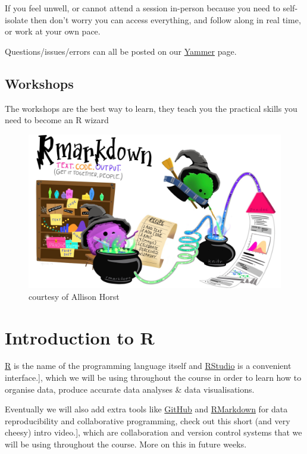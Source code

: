 \documentclass[
]{book}
\begin{document}
If you feel unwell, or cannot attend a session in-person because you need to self-isolate then don't worry you can access everything, and follow along in real time, or work at your own pace.

Questions/issues/errors can all be posted on our \href{https://web.yammer.com/main/groups/eyJfdHlwZSI6Ikdyb3VwIiwiaWQiOiI3OTAyMTk1NzEyMCJ9/all}{Yammer} page.

\hypertarget{workshops}{%
\subsection{Workshops}\label{workshops}}

The workshops are the best way to learn, they teach you the practical skills you need to become an R wizard

\begin{figure}
\includegraphics[width=0.8\linewidth]{images/wizard} \caption{courtesy of Allison Horst}\label{fig:unnamed-chunk-2}
\end{figure}

\hypertarget{introduction-to-r}{%
\section{Introduction to R}\label{introduction-to-r}}

\href{https://www.r-project.org/}{R} is the name of the programming language itself and \href{img/rstudio-ide.pdf}{RStudio} is a convenient interface.{]}, which we will be using throughout the course in order to learn how to organise data, produce accurate data analyses \& data visualisations.

Eventually we will also add extra tools like \href{https://www.youtube.com/watch?v=w3jLJU7DT5E}{GitHub} and \href{https://rmarkdown.rstudio.com/}{RMarkdown} for data reproducibility and collaborative programming, check out this short (and very cheesy) intro video.{]}, which are collaboration and version control systems that we will be using throughout the course. More on this in future weeks.
\end{document}
